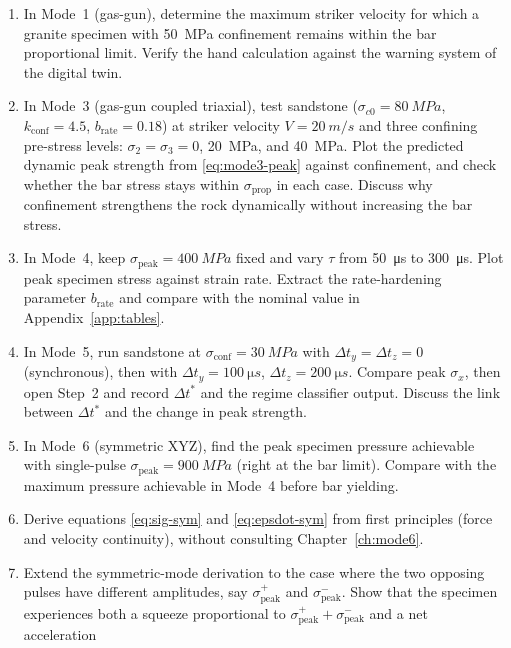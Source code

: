 \documentclass[11pt,a4paper,openany]{book}
\providecommand{\SI}[2]{\qty{#1}{#2}}
\theoremstyle{handbook}
\newcommand{\sig}{\sigma}
\newcommand{\sigprop}{\sig_{\text{prop}}}
\newcommand{\sigpeak}{\sig_{\text{peak}}}
\begin{document}
\begin{enumerate}[leftmargin=*,itemsep=4pt]
  \item In Mode~1 (gas-gun), determine the maximum striker velocity for
        which a granite specimen with \SI{50}{MPa} confinement remains
        within the bar proportional limit. Verify the hand calculation
        against the warning system of the digital twin.
  \item In Mode~3 (gas-gun coupled triaxial), test sandstone
        ($\sig_{c0}=\SI{80}{MPa}$, $k_{\text{conf}}=4.5$,
        $b_{\text{rate}}=0.18$) at striker velocity $V=\SI{20}{m/s}$ and
        three confining pre-stress levels: $\sig_2=\sig_3=0$,
        \SI{20}{MPa}, and \SI{40}{MPa}. Plot the predicted dynamic peak
        strength from \eqref{eq:mode3-peak} against confinement, and check
        whether the bar stress stays within $\sigprop$ in each case.
        Discuss why confinement strengthens the rock dynamically without
        increasing the bar stress.
  \item In Mode~4, keep $\sigpeak=\SI{400}{MPa}$ fixed and vary $\tau$ from
        \SI{50}{\micro s} to \SI{300}{\micro s}. Plot peak specimen stress
        against strain rate. Extract the rate-hardening parameter
        $b_{\text{rate}}$ and compare with the nominal value in
        Appendix~\ref{app:tables}.
  \item In Mode~5, run sandstone at $\sig_{\text{conf}}=\SI{30}{MPa}$ with
        $\Delta t_y=\Delta t_z=0$ (synchronous), then with
        $\Delta t_y=\SI{100}{\micro s}$, $\Delta t_z=\SI{200}{\micro s}$.
        Compare peak $\sig_x$, then open Step~2 and record
        $\Delta t^{\ast}$ and the regime classifier output. Discuss the
        link between $\Delta t^{\ast}$ and the change in peak strength.
  \item In Mode~6 (symmetric XYZ), find the peak specimen pressure
        achievable with single-pulse $\sigpeak=\SI{900}{MPa}$ (right at
        the bar limit). Compare with the maximum pressure achievable in
        Mode~4 before bar yielding.
  \item Derive equations \eqref{eq:sig-sym} and \eqref{eq:epsdot-sym}
        from first principles (force and velocity continuity), without
        consulting Chapter~\ref{ch:mode6}.
  \item Extend the symmetric-mode derivation to the case where the two
        opposing pulses have different amplitudes, say $\sigpeak^{+}$ and
        $\sigpeak^{-}$. Show that the specimen experiences both a squeeze
        proportional to $\sigpeak^{+}+\sigpeak^{-}$ and a net acceleration

\end{enumerate}
\end{document}
